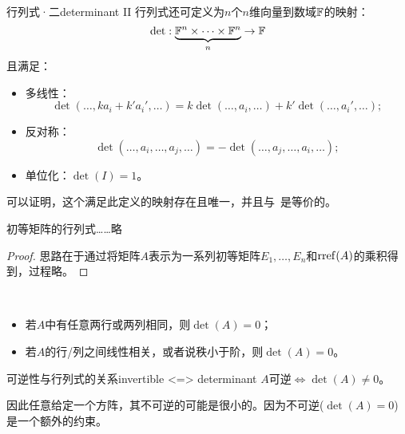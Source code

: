 \begin{definition}
	{行列式·二}{determinant II}
	行列式还可定义为$n$个$n$维向量到数域$\mathbb F$的映射：
	\[
		\det:\underbrace{\mathbb F^n\times\cdots\times\mathbb F^n}_n\to\mathbb F
	\]
	且满足：
	\begin{itemize}
		\item 多线性：
		\begin{equation}
			\det(\ldots,ka_i+k'a_i',\ldots)=k\det(\ldots,a_i,\ldots)+k'\det(\ldots,a_i',\ldots);
		\end{equation}
		\item 反对称：
		\begin{equation}
			\det(\ldots,a_i,\ldots,a_j,\ldots)=-\det(\ldots,a_j,\ldots,a_i,\ldots);
		\end{equation}
		\item 单位化：$\det(I)=1$。
	\end{itemize}
	可以证明，这个满足此定义的映射存在且唯一，并且与~是等价的。
\end{definition}
\begin{lemma}
	初等矩阵的行列式……略
\end{lemma}
\begin{proof}
	思路在于通过将矩阵$A$表示为一系列初等矩阵$E_1,\ldots,E_n$和$\operatorname{rref}(A)$的乘积得到，过程略。
\end{proof}
\begin{corollary}
	~%
	\begin{itemize}
		\item 若$A$中有任意两行或两列相同，则$\det(A)=0$；
		\item 若$A$的行/列之间线性相关，或者说秩小于阶，则$\det(A)=0$。
	\end{itemize}
\end{corollary}


\begin{theorem}
	{可逆性与行列式的关系}{invertible <=> determinant}
	$A$可逆$\iff\det(A)\neq 0$。
\end{theorem}

\begin{remark}
	因此任意给定一个方阵，其不可逆的可能是很小的。因为不可逆($\det(A)=0$)是一个额外的约束。
\end{remark}

